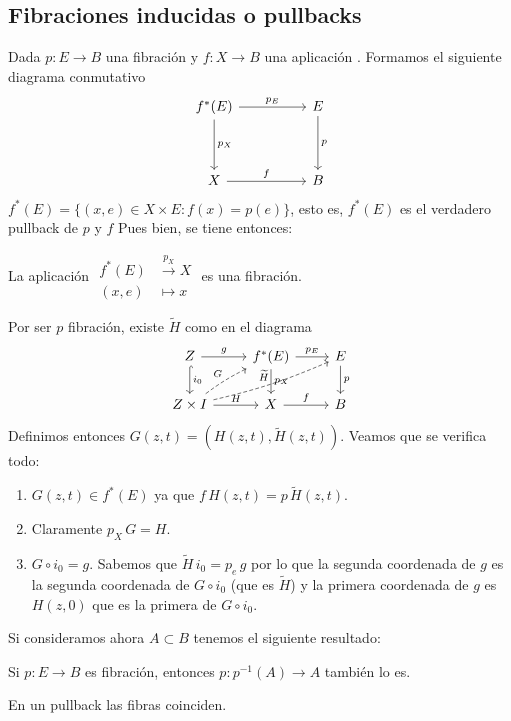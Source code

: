 \subsection*{Fibraciones inducidas o pullbacks}
Dada $p : E \longrightarrow B$ una fibración y $f : X \longrightarrow B$ una aplicación . Formamos el siguiente diagrama conmutativo
\[
\begin{tikzcd}
f^*(E) \arrow{rr}{p_E} \arrow{dd}{p_X} & & E \arrow{dd}{p} \\
\\
X \arrow{rr}{f} & & B
\end{tikzcd}
\]
$f^*(E) = \{ (x,e) \in X \times E : f(x) = p(e) \}$, esto es, $f^*(E)$ es el verdadero pullback de $p$ y $f$ Pues bien, se tiene entonces:
\begin{teor}
La aplicación 
$\begin{aligned}
f^*(E) &\stackrel{p_X}{\longrightarrow} X \\
(x,e) &\longmapsto x
\end{aligned}$ es una fibración.
\end{teor}
\begin{demo}
Por ser $p$ fibración, existe $\widetilde{H}$ como en el diagrama
\[
\begin{tikzcd}
Z\rar{g} \dar[hook]{i_0} & f^*(E) \rar{p_E} \dar{p_X} & E \dar{p} \\
Z\times I \rar{H} \arrow[dashed, bend left=5]{ur}{G} \arrow[dashed, bend right=5]{rru}{\widetilde{H}} & X \rar{f} & B
\end{tikzcd}
\]
Definimos entonces $G(z,t) = (H(z,t), \widetilde{H}(z,t))$. Veamos que se verifica todo:
\begin{enumerate}
\item $G(z,t) \in f^*(E)$ ya que $f \, H(z,t) = p \, \widetilde{H}(z,t)$.
\item Claramente $p_X \, G = H$.
\item $G \circ i_0 = g$. Sabemos que $\widetilde{H} \, i_0 = p_e \, g$ por lo que la segunda coordenada de $g$ es la segunda coordenada de $G \circ i_0$ (que es $\widetilde{H}$) y la primera coordenada de $g$ es $H(z,0)$ que es la primera de $G \circ i_0$. 
\end{enumerate}
\end{demo}
Si consideramos ahora $A \subset B$ tenemos el siguiente resultado:
\begin{coro}
Si $p : E \longrightarrow B$ es fibración, entonces $p : p^{-1}(A) \longrightarrow A$ también lo es.
\end{coro}
\begin{prop}
En un pullback las fibras coinciden.
\end{prop}

